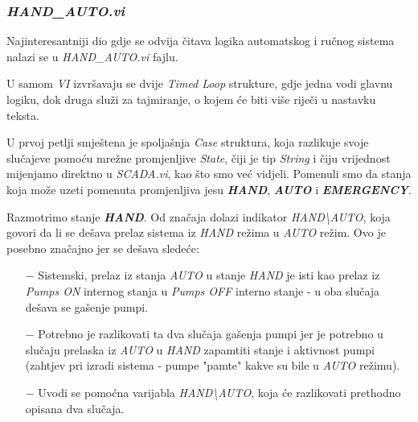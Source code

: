 \documentclass[12pt, titlepage]{article}
\begin{document}
                \newpage

            \subsubsection{\textit{HAND\_AUTO.vi}}

                Najinteresantniji dio gdje se odvija čitava logika automatskog i ručnog sistema nalazi se u \textit{HAND\_AUTO.vi} fajlu.
                
                U samom \textit{VI} izvršavaju se dvije \textit{Timed Loop} strukture, gdje jedna vodi glavnu logiku,
                dok druga služi za tajmiranje, o kojem će biti više riječi u nastavku teksta.

                U prvoj petlji smještena je spoljašnja \textit{Case} struktura, koja razlikuje svoje slučajeve
                pomoću mrežne promjenljive \textit{State}, čiji je tip \textit{String} i čiju vrijednost
                mijenjamo direktno u \textit{SCADA.vi}, kao što smo već vidjeli. Pomenuli smo da stanja
                koja može uzeti pomenuta promjenljiva jesu \textbf{\textit{HAND}}, \textbf{\textit{AUTO}} i 
                \textbf{\textit{EMERGENCY}}. 

                Razmotrimo stanje \textbf{\textit{HAND}}. Od značaja dolazi indikator \textit{HAND\textbackslash{}AUTO}, 
                koja govori da li se dešava prelaz sistema iz \textit{HAND} režima u \textit{AUTO} režim.
                Ovo je posebno značajno jer se dešava sledeće:

                \begin{itemize}
                    \item[$-$] Sistemski, prelaz iz stanja \textit{AUTO} u stanje \textit{HAND} je isti  
                    kao prelaz iz \textit{Pumps ON} internog stanja u \textit{Pumps OFF} interno stanje - 
                    u oba slučaja dešava se gašenje pumpi.
                    \item[$-$] Potrebno je razlikovati ta dva slučaja gašenja pumpi jer je 
                    potrebno u slučaju prelaska iz
                    \textit{AUTO} u \textit{HAND} zapamtiti stanje i aktivnost pumpi (zahtjev
                    pri izradi sistema - pumpe "pamte" kakve su bile u \textit{AUTO} režimu).
                    \item[$-$] Uvodi se pomoćna varijabla \textit{HAND\textbackslash{}AUTO}, koja će razlikovati
                    prethodno opisana dva slučaja.
                \end{itemize}
\end{document}
